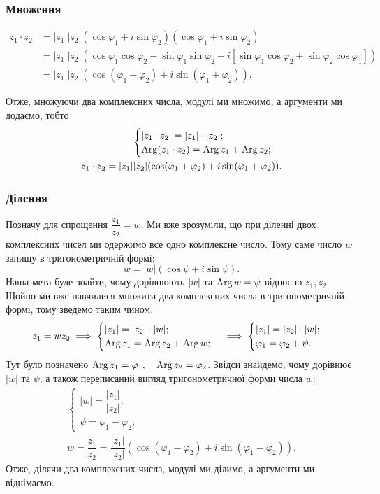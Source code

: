 \documentclass{math_library}
\begin{document}
\subsubsection*{Множення}
\begin{align*}
z_1 \cdot z_2 & = |z_1| |z_2| (\cos \varphi_1 + i \sin \varphi_2) (\cos \varphi_1 + i \sin \varphi_2) \\ & = |z_1| |z_2| (\cos \varphi_1 \cos \varphi_2 - \sin \varphi_1 \sin \varphi_2 + i[\sin \varphi_1 \cos \varphi_2 + \sin \varphi_2 \cos \varphi_1]) \\ 
& = |z_1||z_2|(\cos (\varphi_1 + \varphi_2) + i \sin(\varphi_1 + \varphi_2)).
\end{align*}

Отже, множуючи два комплексних числа, модулі ми множимо, а аргументи ми додаємо, тобто
\begin{align*}
\begin{cases}
|z_1 \cdot z_2| = |z_1| \cdot |z_2|; \\
\operatorname{Arg}(z_1 \cdot z_2) = \operatorname{Arg} z_1 + \operatorname{Arg} z_2;
\end{cases} \\
z_1 \cdot z_2 = |z_1||z_2|(\cos (\varphi_1 + \varphi_2) + i \sin(\varphi_1 + \varphi_2)).
\end{align*}

\subsubsection*{Ділення}
Позначу для спрощення $\dfrac{z_1}{z_2} = w$. Ми вже зрозуміли, що при діленні двох комплексних чисел ми одержимо все одно комплексне число. Тому саме число $w$ запишу в тригонометричній формі: 
\[
w = |w|(\cos \psi + i \sin \psi).
\]
Наша мета буде знайти, чому дорівнюють $|w|$ та $\operatorname{Arg} w = \psi$ відносно $z_1,z_2$.\\
Щойно ми вже навчилися множити два комплексних числа в тригонометричній формі, тому зведемо таким чином:\\
\[
z_1 = w z_2 \implies \begin{cases} |z_1| = |z_2| \cdot |w|; \\ \operatorname{Arg} z_1 = \operatorname{Arg} z_2 + \operatorname{Arg} w; \end{cases} \implies \begin{cases} |z_1| = |z_2| \cdot |w|; \\ \varphi_1 = \varphi_2 + \psi. \end{cases}
\]
Тут було позначено $\operatorname{Arg} z_1 = \varphi_1, \quad \operatorname{Arg} z_2 = \varphi_2$. Звідси знайдемо, чому дорівнює $|w|$ та $\psi$, а також переписаний вигляд тригонометричної форми числа $w$:
\begin{align*}
\begin{cases} |w| = \dfrac{|z_1|}{|z_2|}; \\ \psi = \varphi_1 - \varphi_2; \end{cases} \\
w = \dfrac{z_1}{z_2} = \dfrac{|z_1|}{|z_2|} (\cos (\varphi_1 - \varphi_2) + i \sin (\varphi_1 - \varphi_2)).
\end{align*}
Отже, ділячи два комплексних числа, модулі ми ділимо, а аргументи ми віднімаємо.
\end{document}
